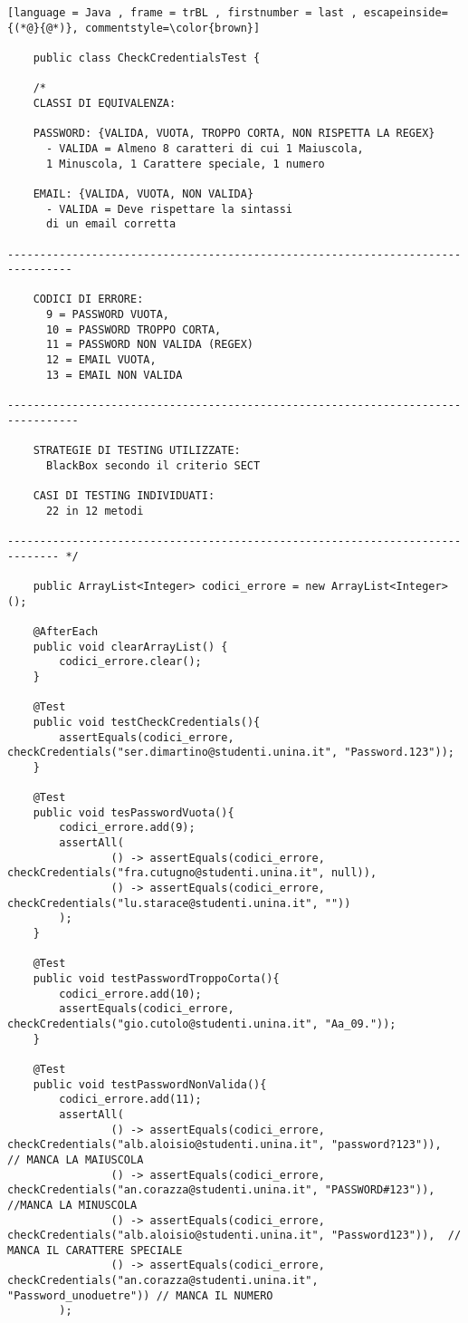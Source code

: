 \begin{lstlisting}[language = Java , frame = trBL , firstnumber = last , escapeinside={(*@}{@*)}, commentstyle=\color{brown}]

    public class CheckCredentialsTest {

    /*
    CLASSI DI EQUIVALENZA:
   
    PASSWORD: {VALIDA, VUOTA, TROPPO CORTA, NON RISPETTA LA REGEX}
      - VALIDA = Almeno 8 caratteri di cui 1 Maiuscola,
      1 Minuscola, 1 Carattere speciale, 1 numero

    EMAIL: {VALIDA, VUOTA, NON VALIDA}
      - VALIDA = Deve rispettare la sintassi
      di un email corretta

--------------------------------------------------------------------------------

    CODICI DI ERRORE:
      9 = PASSWORD VUOTA,
      10 = PASSWORD TROPPO CORTA,
      11 = PASSWORD NON VALIDA (REGEX)
      12 = EMAIL VUOTA, 
      13 = EMAIL NON VALIDA

---------------------------------------------------------------------------------

    STRATEGIE DI TESTING UTILIZZATE: 
      BlackBox secondo il criterio SECT

    CASI DI TESTING INDIVIDUATI: 
      22 in 12 metodi

------------------------------------------------------------------------------ */

    public ArrayList<Integer> codici_errore = new ArrayList<Integer>();

    @AfterEach
    public void clearArrayList() {
        codici_errore.clear();
    }

    @Test
    public void testCheckCredentials(){
        assertEquals(codici_errore, checkCredentials("ser.dimartino@studenti.unina.it", "Password.123"));
    }

    @Test
    public void tesPasswordVuota(){
        codici_errore.add(9);
        assertAll(
                () -> assertEquals(codici_errore, checkCredentials("fra.cutugno@studenti.unina.it", null)),
                () -> assertEquals(codici_errore, checkCredentials("lu.starace@studenti.unina.it", ""))
        );
    }

    @Test
    public void testPasswordTroppoCorta(){
        codici_errore.add(10);
        assertEquals(codici_errore, checkCredentials("gio.cutolo@studenti.unina.it", "Aa_09."));
    }

    @Test
    public void testPasswordNonValida(){
        codici_errore.add(11);
        assertAll(
                () -> assertEquals(codici_errore, checkCredentials("alb.aloisio@studenti.unina.it", "password?123")),  // MANCA LA MAIUSCOLA
                () -> assertEquals(codici_errore, checkCredentials("an.corazza@studenti.unina.it", "PASSWORD#123")),  //MANCA LA MINUSCOLA
                () -> assertEquals(codici_errore, checkCredentials("alb.aloisio@studenti.unina.it", "Password123")),  // MANCA IL CARATTERE SPECIALE
                () -> assertEquals(codici_errore, checkCredentials("an.corazza@studenti.unina.it", "Password_unoduetre")) // MANCA IL NUMERO
        );


\end{lstlisting}
